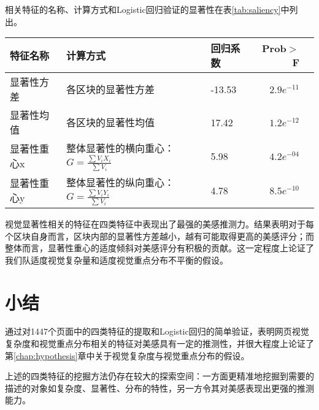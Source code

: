 相关特征的名称、计算方式和Logistic回归验证的显著性在表\ref{tab:saliency}中列出。

\begin{table}[H]
  \centering
  \small
  \begin{tabular}{lllrr}
    \hline
     特征名称 & 计算方式 & 回归系数 & Prob$>$F \\
    \hline
    显著性方差 & 各区块的显著性方差 & -13.53 & $2.9e^{-11}$\\
    显著性均值 & 各区块的显著性均值 & 17.42 & $1.2e^{-12}$\\
    显著性重心x & 整体显著性的横向重心：$G = \frac{\sum V_i X_i}{\sum V_i}$& 5.98 & $4.2e^{-04}$\\
    显著性重心y & 整体显著性的纵向重心：$G = \frac{\sum V_i Y_i}{\sum V_i}$ & 4.78 & $8.5e^{-10}$\\
    \hline
  \end{tabular}
\end{table}

视觉显著性相关的特征在四类特征中表现出了最强的美感推测力。结果表明对于每个区块自身而言，区块内部的显著性方差越小，越有可能取得更高的美感评分；而整体而言，显著性重心的适度倾斜对美感评分有积极的贡献。这一定程度上论证了我们队适度视觉复杂量和适度视觉重点分布不平衡的假设。

\section{小结}
通过对1447个页面中的四类特征的提取和Logistic回归的简单验证，表明网页视觉复杂度和视觉重点分布相关的特征对美感具有一定的推测性，并很大程度上论证了第\ref{chap:hypothesis}章中关于视觉复杂度与视觉重点分布的假设。

上述的四类特征的挖掘方法仍存在较大的探索空间：一方面更精准地挖掘到需要的描述的对象如复杂度、显著性、分布的特性，另一方令其对美感表现出更强的推测能力。
